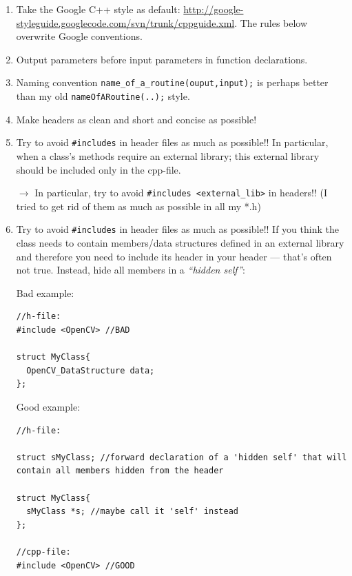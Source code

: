 \begin{enumerate}
\item Take the Google C++ style as default:
  \url{http://google-styleguide.googlecode.com/svn/trunk/cppguide.xml}.
  The rules below overwrite Google conventions.

\item Output parameters before input parameters in function declarations.

\item Naming convention \verb+name_of_a_routine(ouput,input);+ is
  perhaps better than my old \verb+nameOfARoutine(..);+ style.

\item Make headers as clean and short and concise as possible!

\item Try to avoid \verb+#includes+ in header files as much as possible!!
  In particular, when a class's methods require an external library;
  this external library should be included only in the cpp-file.

 $\to$ In particular, try to avoid \verb+#includes <external_lib>+ in headers!! (I
 tried to get rid of them as much as possible in all my *.h)

\item Try to avoid \verb+#includes+ in header files as much as possible!!
  If
  you think the class needs to contain members/data structures defined
  in an external library and therefore you need to include its header
  in your header --- that's often not true. Instead, hide all members
  in a \emph{``hidden self''}:

Bad example:

\begin{code}
\begin{verbatim}
//h-file:
#include <OpenCV> //BAD

struct MyClass{
  OpenCV_DataStructure data;
};
\end{verbatim}
\end{code}

Good example:

\begin{code}
\begin{verbatim}
//h-file:

struct sMyClass; //forward declaration of a 'hidden self' that will
contain all members hidden from the header

struct MyClass{
  sMyClass *s; //maybe call it 'self' instead
};

//cpp-file:
#include <OpenCV> //GOOD


\end{verbatim}
\end{code}
\end{enumerate}
